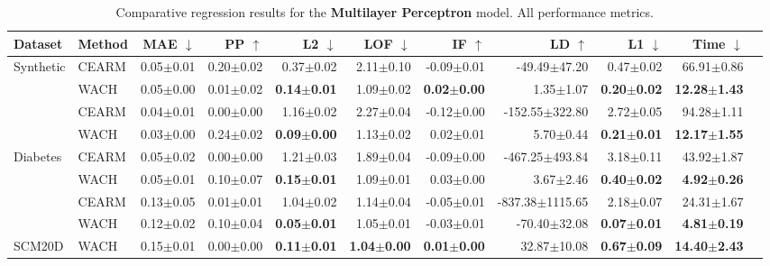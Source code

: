 \begin{table}[ht!]
\centering
\caption{Comparative regression results for the \textbf{Multilayer Perceptron} model. All performance metrics.}
\label{tab:regression_all_dnn}
\begin{center}
\begin{sc}
\begin{tiny}
\begin{tabular}{@{}llrrrrrrrrr@{}}
\toprule
Dataset & Method & MAE $\downarrow$ & PP $\uparrow$ & L2 $\downarrow$ & LOF $\downarrow$ & IF $\uparrow$ & LD $\uparrow$ & L1 $\downarrow$ & Time $\downarrow$ \\
\midrule
\multirow[t]{3}{*}{Synthetic} & CEARM & 0.05$\pm$0.01 & 0.20$\pm$0.02 & 0.37$\pm$0.02 & 2.11$\pm$0.10 & -0.09$\pm$0.01 & -49.49$\pm$47.20 & 0.47$\pm$0.02 & 66.91$\pm$0.86 \\
 & WACH & 0.05$\pm$0.00 & 0.01$\pm$0.02 & \textbf{0.14$\pm$0.01} & 1.09$\pm$0.02 & \textbf{0.02$\pm$0.00} & 1.35$\pm$1.07 & \textbf{0.20$\pm$0.02} & \textbf{12.28$\pm$1.43} \\
\midrule
\multirow[t]{3}{*}{Concrete} & CEARM & 0.04$\pm$0.01 & 0.00$\pm$0.00 & 1.16$\pm$0.02 & 2.27$\pm$0.04 & -0.12$\pm$0.00 & -152.55$\pm$322.80 & 2.72$\pm$0.05 & 94.28$\pm$1.11 \\
 & WACH & 0.03$\pm$0.00 & 0.24$\pm$0.02 & \textbf{0.09$\pm$0.00} & 1.13$\pm$0.02 & 0.02$\pm$0.01 & 5.70$\pm$0.44 & \textbf{0.21$\pm$0.01} & \textbf{12.17$\pm$1.55} \\
\midrule
\multirow[t]{3}{*}{Diabetes} & CEARM & 0.05$\pm$0.02 & 0.00$\pm$0.00 & 1.21$\pm$0.03 & 1.89$\pm$0.04 & -0.09$\pm$0.00 & -467.25$\pm$493.84 & 3.18$\pm$0.11 & 43.92$\pm$1.87 \\
 & WACH & 0.05$\pm$0.01 & 0.10$\pm$0.07 & \textbf{0.15$\pm$0.01} & 1.09$\pm$0.01 & 0.03$\pm$0.00 & 3.67$\pm$2.46 & \textbf{0.40$\pm$0.02} & \textbf{4.92$\pm$0.26} \\
\midrule
\multirow[t]{3}{*}{Yacht} & CEARM & 0.13$\pm$0.05 & 0.01$\pm$0.01 & 1.04$\pm$0.02 & 1.14$\pm$0.04 & -0.05$\pm$0.01 & -837.38$\pm$1115.65 & 2.18$\pm$0.07 & 24.31$\pm$1.67 \\
 & WACH & 0.12$\pm$0.02 & 0.10$\pm$0.04 & \textbf{0.05$\pm$0.01} & 1.05$\pm$0.01 & -0.03$\pm$0.01 & -70.40$\pm$32.08 & \textbf{0.07$\pm$0.01} & \textbf{4.81$\pm$0.19} \\
\midrule
\multirow[t]{2}{*}{SCM20D} & WACH & 0.15$\pm$0.01 & 0.00$\pm$0.00 & \textbf{0.11$\pm$0.01} & \textbf{1.04$\pm$0.00} & \textbf{0.01$\pm$0.00} & 32.87$\pm$10.08 & \textbf{0.67$\pm$0.09} & \textbf{14.40$\pm$2.43} \\
\bottomrule
\end{tabular}
\end{tiny}
\end{sc}
\end{center}
\end{table}

